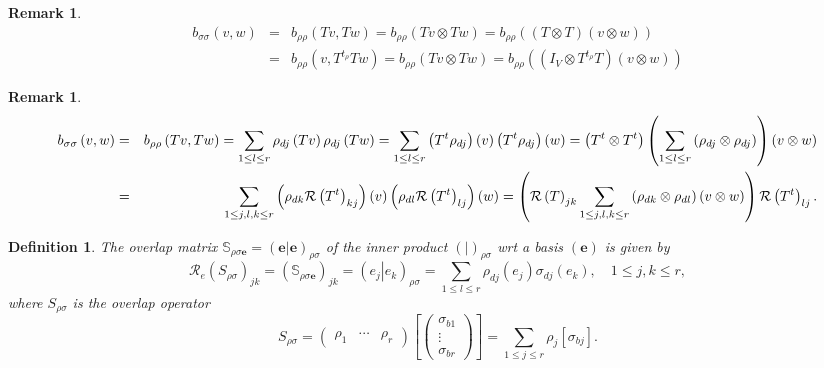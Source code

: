 \documentclass[aps,preprint]{revtex4}
\newtheorem{definition}[theorem]{Definition}
\newtheorem{remark}[theorem]{Remark}
\begin{document}
\begin{remark}
\begin{eqnarray*}
b_{\sigma \sigma }\left( v,w\right) &=&b_{\rho \rho }\left( Tv,Tw\right)
=b_{\rho \rho }\left( Tv\otimes Tw\right) =b_{\rho \rho }\left( \left(
T\otimes T\right) \left( v\otimes w\right) \right) \\
&=&b_{\rho \rho }\left( v,T^{t_{\rho }}Tw\right) =b_{\rho \rho }\left(
Tv\otimes Tw\right) =b_{\rho \rho }\left( \left( I_{V}\otimes T^{t_{\rho
}}T\right) \left( v\otimes w\right) \right)
\end{eqnarray*}
\end{remark}

\begin{remark}
\begin{eqnarray}
b_{\sigma \sigma }\left( v,w\right) &=&b_{\rho \rho }\left( Tv,Tw\right)
=\sum_{1\leq l\leq r}\rho _{dj}\left( Tv\right) \rho _{dj}\left( Tw\right)
=\sum_{1\leq l\leq r}\left( T^{t}\rho _{dj}\right) \left( v\right) \left(
T^{t}\rho _{dj}\right) \left( w\right) =\left( T^{t}\otimes T^{t}\right)
\left( \sum_{1\leq l\leq r}\left( \rho _{dj}\otimes \rho _{dj}\right)
\right) \left( v\otimes w\right)  \notag \\
&=&\sum_{1\leq j,l,k\leq r}\left( \rho _{dk}\mathcal{R}\left( T^{t}\right)
_{kj}\right) \left( v\right) \left( \rho _{dl}\mathcal{R}\left( T^{t}\right)
_{lj}\right) \left( w\right) =\left( \mathcal{R}\left( T\right)
_{jk}\sum_{1\leq j,l,k\leq r}\left( \rho _{dk}\otimes \rho _{dl}\right)
\left( v\otimes w\right) \right) \mathcal{R}\left( T^{t}\right) _{lj}.
\end{eqnarray}
\end{remark}

\begin{definition}
The \emph{overlap matrix} $\mathbb{S}_{\rho \sigma \boldsymbol{e}}=\left(
\left. \boldsymbol{e}\right\vert \boldsymbol{e}\right) _{\rho \sigma }$ of
the inner product $\left( \left. {}\right\vert \right) _{\rho \sigma }$ wrt
a basis $\left( \boldsymbol{e}\right) $ is given by 
\begin{equation}
\mathcal{R}_{e}\left( S_{\rho \sigma }\right) _{jk}=\left( \mathbb{S}_{\rho
\sigma \boldsymbol{e}}\right) _{jk}=\left( \left. e_{j}\right\vert
e_{k}\right) _{\rho \sigma }=\sum_{1\leq l\leq r}\rho _{dj}\left(
e_{j}\right) \sigma _{dj}\left( e_{k}\right) ,\quad 1\leq j,k\leq r,
\end{equation}%
where $S_{\rho \sigma }$ is the overlap operator 
\begin{equation}
S_{\rho \sigma }=\left( 
\begin{array}{ccc}
\rho _{1} & \cdots & \rho _{r}%
\end{array}%
\right) \left[ \left( 
\begin{array}{c}
\sigma _{b1} \\ 
\vdots \\ 
\sigma _{br}%
\end{array}%
\right) \right] =\sum_{1\leq j\leq r}\rho _{j}\left[ \sigma _{bj}\right] .
\end{equation}
\end{definition}
\end{document}
